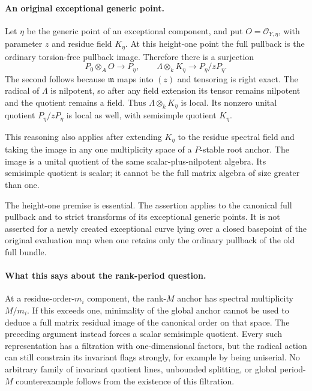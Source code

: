 \paragraph{An original exceptional generic point.}
Let $\eta$ be the generic point of an exceptional component, and put
$O=\mathcal O_{Y,\eta}$, with parameter $z$ and residue field $K_\eta$.
At this height-one point the full pullback is the ordinary
torsion-free pullback image.  Therefore there is a surjection
\[
 P_0\otimes_A O\longrightarrow P_\eta,
 \qquad
 \Lambda\otimes_k K_\eta\longrightarrow P_\eta/zP_\eta.
\]
The second follows because $\mathfrak m$ maps into $(z)$ and
tensoring is right exact.  The radical of $\Lambda$ is nilpotent,
so after any field extension its tensor remains nilpotent and the
quotient remains a field.  Thus $\Lambda\otimes_k K_\eta$ is local.
Its nonzero unital quotient $P_\eta/zP_\eta$ is local as well, with
semisimple quotient $K_\eta$.

This reasoning also applies after extending $K_\eta$ to the residue
spectral field and taking the image in any one multiplicity space of
a $P$-stable root anchor.  The image is a unital quotient of the
same scalar-plus-nilpotent algebra.  Its semisimple quotient is scalar;
it cannot be the full matrix algebra of size greater than one.

The height-one premise is essential.  The assertion applies to the
canonical full pullback and to strict transforms of its exceptional
generic points.  It is not asserted for a newly created exceptional
curve lying over a closed basepoint of the original evaluation map
when one retains only the ordinary pullback of the old full bundle.

\paragraph{What this says about the rank-period question.}
At a residue-order-$m_i$ component, the rank-$M$ anchor has spectral
multiplicity $M/m_i$.  If this exceeds one, minimality of the global
anchor cannot be used to deduce a full matrix residual image of the
canonical order on that space.  The preceding argument instead
forces a scalar semisimple quotient.  Every such representation has
a filtration with one-dimensional factors, but the radical action
can still constrain its invariant flags strongly, for example by
being uniserial.  No arbitrary family of invariant quotient lines,
unbounded splitting, or global period-$M$ counterexample follows
from the existence of this filtration.

